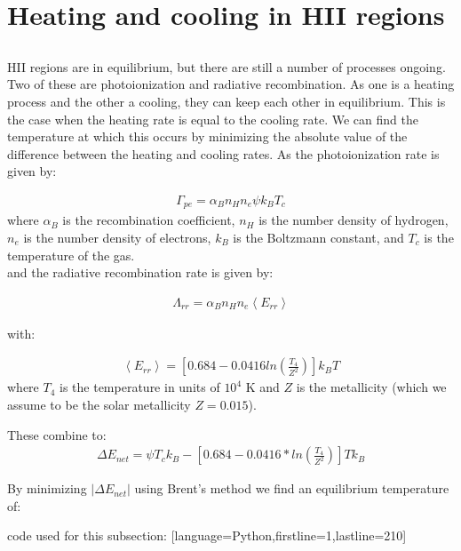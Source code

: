 \section{Heating and cooling in HII regions}

\subsection{}
HII regions are in equilibrium, but there are still a number of processes ongoing.
Two of these are photoionization and radiative recombination.
As one is a heating process and the other a cooling, they can keep each other in equilibrium.
This is the case when the heating rate is equal to the cooling rate.
We can find the temperature at which this occurs by minimizing the absolute value of the difference between the heating and cooling rates.
As the photoionization rate is given by:

\begin{align}
    \Gamma_{pe} = \alpha_B n_H n_e \psi k_B T_c
\end{align}
where $\alpha_B$ is the recombination coefficient, $n_H$ is the number density of hydrogen, $n_e$ is the number density of electrons, 
$k_B$ is the Boltzmann constant, and $T_c$ is the temperature of the gas.
\\
and the radiative recombination rate is given by:

\begin{align}
    \Lambda_{rr} = \alpha_B n_H n_e \left< E_{rr} \right>
\end{align}

with:

\begin{align}
    \left< E_{rr} \right> = \left[ 0.684 - 0.0416 ln\left( \frac{T_4}{Z^2} \right) \right] k_B T
\end{align}
where $T_4$ is the temperature in units of $10^4$ K and $Z$ is the metallicity (which we assume to be the solar metallicity $Z=0.015$).

These combine to:
\begin{align}
    \Delta E_{net} = \psi T_c k_B - \left[ 0.684 - 0.0416 * ln\left( \frac{T_4}{Z^2} \right) \right] T k_B
\end{align}

By minimizing $| \Delta E_{net} |$ using Brent's method we find an equilibrium temperature of:


code used for this subsection:
[language=Python,firstline=1,lastline=210]

